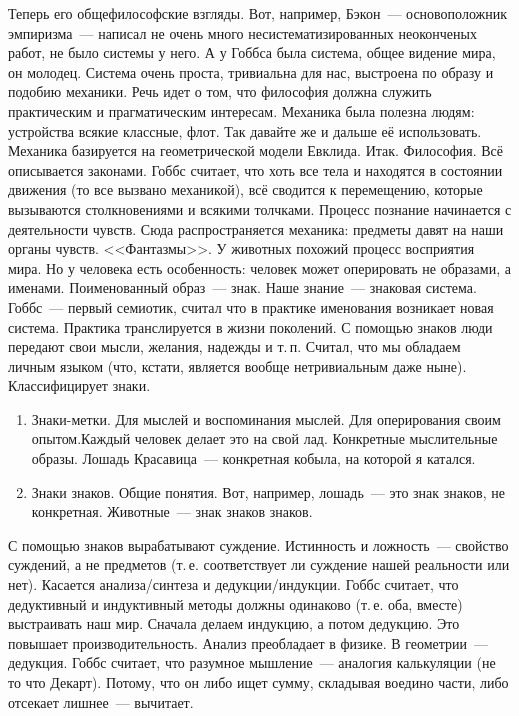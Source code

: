 Теперь его общефилософские взгляды.
Вот, например, Бэкон~--- основоположник эмпиризма~--- написал не очень много несистематизированных неоконченых работ, не было системы у него. А у Гоббса была система, общее видение мира, он молодец. Система очень проста, тривиальна для нас, выстроена по образу и подобию механики. Речь идет о том, что философия должна служить практическим и прагматическим интересам. Механика была полезна людям: устройства всякие классные, флот. Так давайте же и дальше её использовать. Механика базируется на геометрической модели Евклида. Итак. Философия. Всё описывается законами. Гоббс считает, что хоть все тела и находятся в состоянии движения (то все вызвано механикой), всё сводится к перемещению, которые вызываются столкновениями и всякими толчками. Процесс познание начинается с деятельности чувств. Сюда распространяется механика: предметы давят на наши органы чувств. <<Фантазмы>>. У животных похожий процесс восприятия мира. Но у человека есть особенность: человек может оперировать не образами, а именами. Поименованный образ~--- знак. Наше знание~--- знаковая система. Гоббс~--- первый семиотик, считал что в практике именования возникает новая система. Практика транслируется в жизни поколений. С помощью знаков люди передают свои мысли, желания, надежды и т.\,п. Считал, что мы обладаем личным языком (что, кстати, является вообще нетривиальным даже ныне). Классифицирует знаки.
\begin{enumerate}
	\item Знаки-метки. Для мыслей и воспоминания мыслей. Для оперирования своим опытом.Каждый человек делает это на свой лад. Конкретные мыслительные образы. Лошадь Красавица~--- конкретная кобыла, на которой я катался.
	\item Знаки знаков. Общие понятия. Вот, например, лошадь~--- это знак знаков, не конкретная. Животные~--- знак знаков знаков.
\end{enumerate}
	
С помощью знаков вырабатывают суждение. Истинность и ложность~--- свойство суждений, а не предметов (т.\,е. соответствует ли суждение нашей реальности или нет). 
Касается анализа/синтеза и дедукции/индукции. Гоббс считает, что дедуктивный и индуктивный методы должны одинаково (т.\,е. оба, вместе) выстраивать наш мир. Сначала делаем индукцию, а потом дедукцию. Это повышает производительность. Анализ преобладает в физике. В геометрии~--- дедукция. Гоббс считает, что разумное мышление~--- аналогия калькуляции (не то что Декарт). Потому, что он либо ищет сумму, складывая воедино части, либо отсекает лишнее~--- вычитает.

